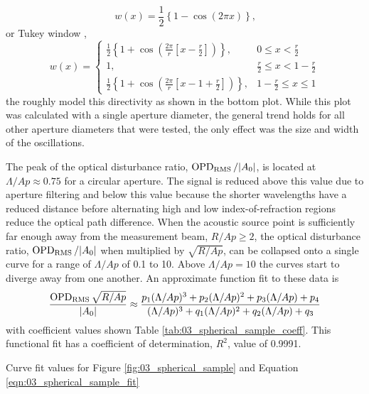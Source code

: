 \begin{equation}
  w(x) = \frac{1}{2}\left\{1-\cos\left(2\pi x\right)\right\} \textrm{,}
\end{equation}
or Tukey window \cite{Bloomfield-2000-vD9dkPMd},
\begin{equation}
  w(x) = \begin{cases}
    \frac{1}{2}\left\{1+\cos\left(\frac{2\pi}{r}\left[x-\frac{r}{2}\right]\right)\right\}, & 0\leq x < \frac{r}{2} \\
    1, & \frac{r}{2}\leq x < 1-\frac{r}{2} \\
    \frac{1}{2}\left\{1+\cos\left(\frac{2\pi}{r}\left[x-1+\frac{r}{2}\right]\right)\right\}, & 1-\frac{r}{2} \leq x \leq 1
  \end{cases}
\end{equation}
the roughly model this directivity as shown in the bottom plot.
While this plot was calculated with a single aperture diameter, the general trend holds for all other aperture diameters that were tested, the only effect was the size and width of the oscillations.

The peak of the optical disturbance ratio, $\operatorname{OPD_{RMS}}/|A_0|$, is located at $\Lambda/Ap\approx0.75$ for a circular aperture.
The signal is reduced above this value due to aperture filtering and below this value because the shorter wavelengths have a reduced distance before alternating high and low index-of-refraction regions reduce the optical path difference.
When the acoustic source point is sufficiently far enough away from the measurement beam, $R/Ap\geq2$, the optical disturbance ratio, $\operatorname{OPD_{RMS}}/|A_0|$ when multiplied by $\sqrt{R/Ap}$, can be collapsed onto a single curve for a range of $\Lambda/Ap$ of 0.1 to 10.
Above $\Lambda/Ap=10$ the curves start to diverge away from one another.
An approximate function fit to these data is
\begin{equation}
  \frac{\operatorname{OPD_{RMS}}\sqrt{R/Ap}}{|A_0|} \approx \frac{p_1(\Lambda/Ap)^3+p_2(\Lambda/Ap)^2+p_3(\Lambda/Ap)+p_4}{(\Lambda/Ap)^3+q_1(\Lambda/Ap)^2+q_2(\Lambda/Ap)+q_3}
  \label{eqn:03_spherical_sample_fit}
\end{equation}
with coefficient values shown Table \ref{tab:03_spherical_sample_coeff}.
This functional fit has a coefficient of determination, $R^2$, value of 0.9991.
\begin{table}
\centering
\caption{Curve fit values for Figure \ref{fig:03_spherical_sample} and Equation \ref{eqn:03_spherical_sample_fit}}

\label{tab:03_spherical_sample_coeff}
\end{table}


